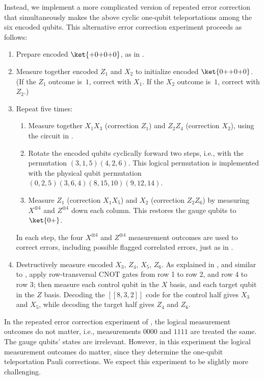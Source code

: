\documentclass[10pt, twocolumn, aps, nofootinbib, longbibliography, nobibnotes, superscriptaddress]{revtex4-1} %
\begin{document}
Instead, we implement a more complicated version of repeated error correction that simultaneously makes the above cyclic one-qubit teleportations %
among the six encoded qubits.  This alternative error correction experiment proceeds as follows: 
\begin{enumerate}[leftmargin=*]
\item Prepare encoded $\ket{{+}0{+}0{+}0}$, as in .  
\item Measure together encoded $Z_1$ and $X_2$ to initialize encoded $\ket{0{+}{+}0{+}0}$.  (If the $Z_1$ outcome is~$1$, correct with $X_1$.  If the $X_2$ outcome is~$1$, correct with $Z_2$.)  
\item Repeat five times: 
\begin{enumerate}[leftmargin=*]
\item Measure together $X_1 X_3$ (correction $Z_1$) and $Z_2 Z_4$ (correction $X_2$), using the circuit in .  
\item Rotate the encoded qubits cyclically forward two steps, i.e., with the permutation $(3,1,5)(4,2,6)$.  This logical permutation is implemented with the physical qubit permutation $(0,2,5)(3,6,4)(8,15,10)(9,12,14)$.  
\item Measure $Z_1$ (correction $X_1 X_5$) and $X_2$ (correction $Z_2 Z_6$) by measuring $X^{\otimes 4}$ and $Z^{\otimes 4}$ down each column.  This restores the gauge qubits to $\ket{0{+}}$.  
\end{enumerate}
In each step, the four $X^{\otimes 4}$ and $Z^{\otimes 4}$ measurement outcomes are used to correct errors, including possible flagged correlated errors, just as in .  
\item Destructively measure encoded $X_3$, $Z_4$, $X_5$, $Z_6$.  As explained in , and similar to , apply row-transversal CNOT gates from row 1 to row 2, and row 4 to row 3; then measure each control qubit in the $X$ basis, and each target qubit in the $Z$ basis.  Decoding the $[[8,3,2]]$ code for the control half gives $X_3$ and $X_5$, while decoding the target half gives $Z_4$ and $Z_6$.  
\end{enumerate}
In the repeated error correction experiment of , the logical measurement outcomes do not matter, i.e., measurements $0000$ and $1111$ are treated the same.  The gauge qubits' states are irrelevant.  However, in this experiment the logical measurement outcomes do matter, since they determine the one-qubit teleportation Pauli corrections.  We expect this experiment to be slightly more challenging.  
\end{document}
